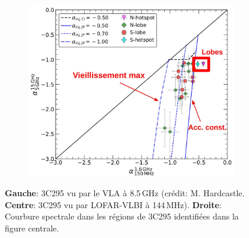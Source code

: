 \begin{figure}[h!]
\begin{subfigure}{.3\textwidth}
		\label{fig.ccplot.diag}
	\end{subfigure}
	\hfill
	\begin{subfigure}{.35\textwidth}
		\vspace{0.3cm}
		\includegraphics[width=\linewidth]{avg_all_ccplot_annotated.jpeg}
	\end{subfigure}
	\hfill
	\caption{\textbf{Gauche}: 3C295 vu par le VLA \`a 8.5\,GHz  (cr\'edit: M. Hardcastle. \textbf{Centre}: 3C295 vu par LOFAR-VLBI \`a 144\,MHz). \textbf{Droite}: Courbure spectrale dans les r\'egions de 3C295 identifi\'ees dans la figure centrale.}
	\label{fig.3C295}	
\end{figure}

%
%





